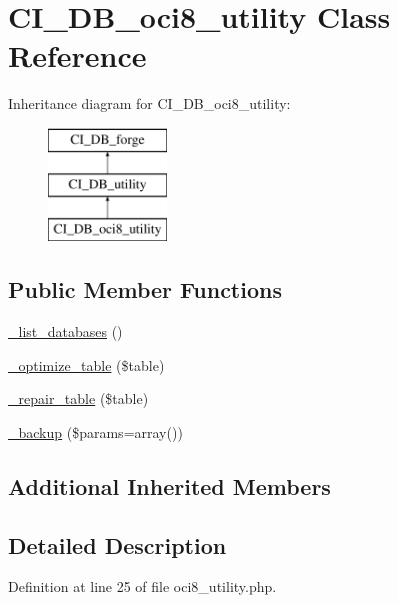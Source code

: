 \hypertarget{class_c_i___d_b__oci8__utility}{\section{C\-I\-\_\-\-D\-B\-\_\-oci8\-\_\-utility Class Reference}
\label{class_c_i___d_b__oci8__utility}
}
Inheritance diagram for C\-I\-\_\-\-D\-B\-\_\-oci8\-\_\-utility\-:\begin{figure}[H]
\begin{center}
\leavevmode
\includegraphics[height=3.000000cm]{class_c_i___d_b__oci8__utility}
\end{center}
\end{figure}
\subsection*{Public Member Functions}
\begin{DoxyCompactItemize}
\item 
\hyperlink{class_c_i___d_b__oci8__utility_aa047e69a7e732ca7280270f87f82bb3a}{\-\_\-list\-\_\-databases} ()
\item 
\hyperlink{class_c_i___d_b__oci8__utility_a4856292816fbbc8e9d927f565766727b}{\-\_\-optimize\-\_\-table} (\$table)
\item 
\hyperlink{class_c_i___d_b__oci8__utility_a7f40d4a3d78917e455e315cf708842ef}{\-\_\-repair\-\_\-table} (\$table)
\item 
\hyperlink{class_c_i___d_b__oci8__utility_a30f3053d2c82e7562349924363507afa}{\-\_\-backup} (\$params=array())
\end{DoxyCompactItemize}
\subsection*{Additional Inherited Members}


\subsection{Detailed Description}


Definition at line 25 of file oci8\-\_\-utility.\-php.



